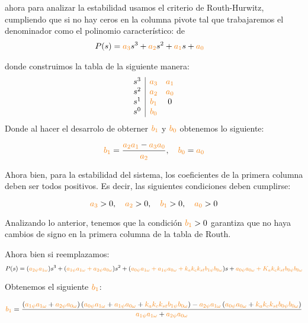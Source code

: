 ahora para analizar la estabilidad usamos el criterio de Routh-Hurwitz, cumpliendo que si no hay ceros en la columna pivote tal que trabajaremos el denominador como el polinomio característico: de 
\begin{align}
    P(s) = \nara{a_3} s^3 + \nara{a_2} s^2 + \nara{a_1} s + \nara{a_0} &
\end{align}

donde construimos la tabla de la siguiente manera:
\[
\begin{array}{c|cc}
s^3 & \nara{a_3} & \nara{a_1} \\
s^2 & \nara{a_2} & \nara{a_0} \\
s^1 & \nara{b_1} & 0 \\
s^0 & \nara{b_0} & 
\end{array}
\]
Donde al hacer el desarrolo de obterner \(\nara{b_1}\) y \(\nara{b_0}\) obtenemos lo siguiente:

\[
\nara{b_1} = \frac{\nara{a_2 a_1} - \nara{a_3 a_0}}{\nara{a_2}}, \quad \nara{b_0} = \nara{a_0}
\]

Ahora bien, para la estabilidad del sistema, los coeficientes de la primera columna deben ser todos positivos. Es decir, las siguientes condiciones deben cumplirse:

\[
\nara{a_3} > 0, \quad \nara{a_2} > 0, \quad \nara{b_1} > 0, \quad \nara{a_0} > 0
\]

Analizando lo anterior, tenemos que la condición \( \nara{b_1} > 0 \) garantiza que no haya cambios de signo en la primera columna de la tabla de Routh.

Ahora bien si reemplazamos:
 \[
 P(s)=(\nara{a_{2\psi} a_{1\omega}})s^3 + (\nara{a_{1\psi} a_{1\omega} + a_{2\psi} a_{0\omega}})s^2 + (\nara{a_{0\psi} a_{1\omega} + a_{1\psi} a_{0\omega} + k_a k_c k_{st} b_{1\psi} b_{0\omega}})s + \nara{a_{0\psi} a_{0\omega} + K_a k_c k_{st} b_{0\psi} b_{0\omega}}
 \] 

Obtenemos el siguiente $\nara{b_1}$:
 

\begin{equation}
    \nara{b_1}=\frac{
        \left(\nara{a_{1\psi} a_{1\omega}} + \nara{a_{2\psi} a_{0\omega}}\right)
        \left(\nara{a_{0\psi} a_{1\omega}} + \nara{a_{1\psi} a_{0\omega}} + \nara{k_a k_c k_{st} b_{1\psi} b_{0\omega}}\right) 
        - \nara{a_{2\psi} a_{1\omega}} 
        \left(\nara{a_{0\psi} a_{0\omega}} + \nara{k_a k_c k_{st} b_{0\psi} b_{0\omega}}\right)
    }{
        \nara{a_{1\psi} a_{1\omega}} + \nara{a_{2\psi} a_{0\omega}}
    }
\end{equation}

